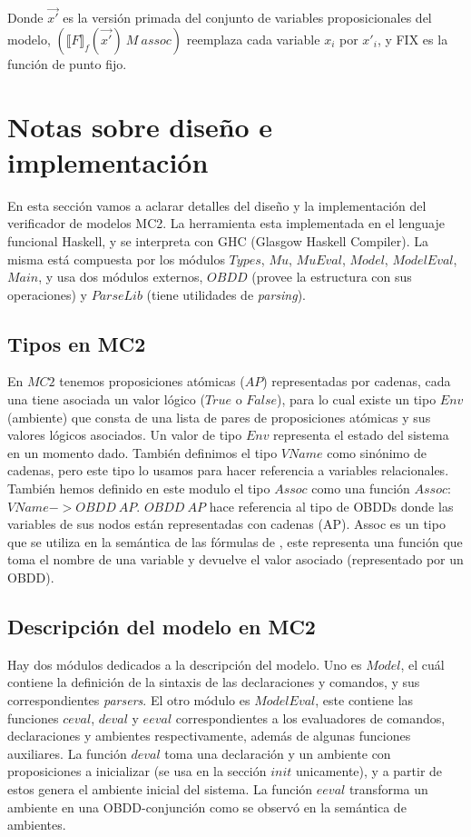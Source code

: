 Donde $\vec {x'}$ es la versión primada del conjunto de variables proposicionales del modelo, $(\llbracket F \rrbracket _{f}(\vec {x'})\ M\ assoc)$ reemplaza cada variable $x_{i}$ por $x'_{i}$, y FIX es la función de punto fijo.

\section{Notas sobre diseño e implementación}

En esta sección vamos a aclarar detalles del diseño y la implementación del verificador de modelos MC2. La herramienta esta implementada en el lenguaje funcional Haskell, y se interpreta con GHC (Glasgow Haskell Compiler). La misma está compuesta por los módulos $Types$, $Mu$, $MuEval$, $Model$, $ModelEval$, $Main$, y usa dos módulos externos, $OBDD$ \cite{Waldmann:6} (provee la estructura con sus operaciones) y $ParseLib$ \cite{Hutton:10} (tiene utilidades de \emph{parsing}).

\subsection{Tipos en MC2}

En $MC2$ tenemos proposiciones atómicas ($AP$) representadas por cadenas, cada una tiene asociada un valor lógico ($True$ o $False$), para lo cual existe un tipo $Env$ (ambiente) que consta de una lista de pares de proposiciones atómicas y sus valores lógicos asociados. Un valor de tipo $Env$ representa el estado del sistema en un momento dado. También definimos el tipo $VName$ como sinónimo de cadenas, pero este tipo lo usamos para hacer referencia a variables relacionales. También hemos definido en este modulo el tipo $Assoc$ como una función $Assoc$: $VName -> OBDD\ AP$. $OBDD\ AP$ hace referencia al tipo de OBDDs donde las variables de sus nodos están representadas con cadenas (AP). Assoc es un tipo que se utiliza en la semántica de las fórmulas de {\mucalculo}, este representa una función que toma el nombre de una variable y devuelve el valor asociado (representado por un OBDD).

\subsection{Descripción del modelo en MC2}

Hay dos módulos dedicados a la descripción del modelo. Uno es $Model$, el cuál contiene la definición de la sintaxis de las declaraciones y comandos, y  sus correspondientes \textit{parsers}. El otro módulo es $ModelEval$, este contiene las funciones $ceval$, $deval$ y $eeval$ correspondientes a los evaluadores de comandos, declaraciones y ambientes respectivamente, además de algunas funciones auxiliares. La función $deval$ toma una declaración y un ambiente con proposiciones a inicializar (se usa en la sección $init$ unicamente), y a partir de estos genera el ambiente inicial del sistema. La función $eeval$ transforma un ambiente en una OBDD-conjunción como se observó en la semántica de ambientes.

